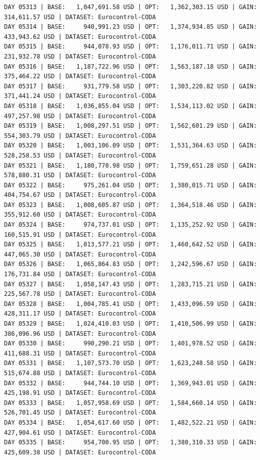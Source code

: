 \documentclass[11pt,a4paper]{article}
\begin{document}
\begin{verbatim}
DAY 05313 | BASE:   1,047,691.58 USD | OPT:   1,362,303.15 USD | GAIN: 314,611.57 USD | DATASET: Eurocontrol-CODA
DAY 05314 | BASE:     940,991.23 USD | OPT:   1,374,934.85 USD | GAIN: 433,943.62 USD | DATASET: Eurocontrol-CODA
DAY 05315 | BASE:     944,078.93 USD | OPT:   1,176,011.71 USD | GAIN: 231,932.78 USD | DATASET: Eurocontrol-CODA
DAY 05316 | BASE:   1,187,722.96 USD | OPT:   1,563,187.18 USD | GAIN: 375,464.22 USD | DATASET: Eurocontrol-CODA
DAY 05317 | BASE:     931,779.58 USD | OPT:   1,303,220.82 USD | GAIN: 371,441.24 USD | DATASET: Eurocontrol-CODA
DAY 05318 | BASE:   1,036,855.04 USD | OPT:   1,534,113.02 USD | GAIN: 497,257.98 USD | DATASET: Eurocontrol-CODA
DAY 05319 | BASE:   1,008,297.51 USD | OPT:   1,562,601.29 USD | GAIN: 554,303.79 USD | DATASET: Eurocontrol-CODA
DAY 05320 | BASE:   1,003,106.09 USD | OPT:   1,531,364.63 USD | GAIN: 528,258.53 USD | DATASET: Eurocontrol-CODA
DAY 05321 | BASE:   1,180,770.98 USD | OPT:   1,759,651.28 USD | GAIN: 578,880.31 USD | DATASET: Eurocontrol-CODA
DAY 05322 | BASE:     975,261.04 USD | OPT:   1,380,015.71 USD | GAIN: 404,754.67 USD | DATASET: Eurocontrol-CODA
DAY 05323 | BASE:   1,008,605.87 USD | OPT:   1,364,518.46 USD | GAIN: 355,912.60 USD | DATASET: Eurocontrol-CODA
DAY 05324 | BASE:     974,737.01 USD | OPT:   1,135,252.92 USD | GAIN: 160,515.91 USD | DATASET: Eurocontrol-CODA
DAY 05325 | BASE:   1,013,577.21 USD | OPT:   1,460,642.52 USD | GAIN: 447,065.30 USD | DATASET: Eurocontrol-CODA
DAY 05326 | BASE:   1,065,864.83 USD | OPT:   1,242,596.67 USD | GAIN: 176,731.84 USD | DATASET: Eurocontrol-CODA
DAY 05327 | BASE:   1,058,147.43 USD | OPT:   1,283,715.21 USD | GAIN: 225,567.78 USD | DATASET: Eurocontrol-CODA
DAY 05328 | BASE:   1,004,785.41 USD | OPT:   1,433,096.59 USD | GAIN: 428,311.17 USD | DATASET: Eurocontrol-CODA
DAY 05329 | BASE:   1,024,410.03 USD | OPT:   1,410,506.99 USD | GAIN: 386,096.96 USD | DATASET: Eurocontrol-CODA
DAY 05330 | BASE:     990,290.21 USD | OPT:   1,401,978.52 USD | GAIN: 411,688.31 USD | DATASET: Eurocontrol-CODA
DAY 05331 | BASE:   1,107,573.70 USD | OPT:   1,623,248.58 USD | GAIN: 515,674.88 USD | DATASET: Eurocontrol-CODA
DAY 05332 | BASE:     944,744.10 USD | OPT:   1,369,943.01 USD | GAIN: 425,198.91 USD | DATASET: Eurocontrol-CODA
DAY 05333 | BASE:   1,057,958.69 USD | OPT:   1,584,660.14 USD | GAIN: 526,701.45 USD | DATASET: Eurocontrol-CODA
DAY 05334 | BASE:   1,054,617.60 USD | OPT:   1,482,522.21 USD | GAIN: 427,904.61 USD | DATASET: Eurocontrol-CODA
DAY 05335 | BASE:     954,700.95 USD | OPT:   1,380,310.33 USD | GAIN: 425,609.38 USD | DATASET: Eurocontrol-CODA

\end{verbatim}
\end{document}
